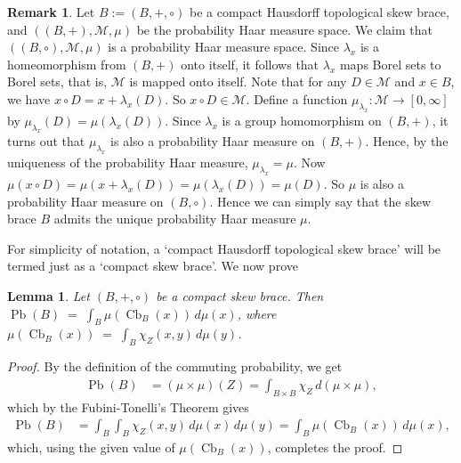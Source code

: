 \documentclass[oneside]{amsart}
\numberwithin{equation}{section}
\theoremstyle{plain}
\newtheorem{lem}[equation]{Lemma}
\theoremstyle{definition}
\newtheorem{remark}[equation]{Remark}
\newcommand{\Cb}{\operatorname{Cb} }
\newcommand{\Pb}{\operatorname{Pb} }
\begin{document}
\begin{remark}\label{rem6.4}
Let $B := (B,+, \circ)$ be a compact Hausdorff topological skew brace, and $((B, +), \mathcal{M}, \mu)$ be the probability Haar measure space.  We claim that $((B, \circ), \mathcal{M}, \mu)$  is a probability Haar measure space.  Since ${\lambda_x}$ is a homeomorphism from  $(B,+)$ onto itself, it follows that 
 ${\lambda_x}$ maps Borel sets to Borel sets, that is, $\mathcal{M}$ is mapped onto itself. Note that for any  $D \in \mathcal{M}$ and $x \in B$, we have    $x \circ D =  x + \lambda_x(D)$. So $x\circ D\in \mathcal{M}$.  Define a function $\mu_{\lambda_x}:\mathcal{M}\rightarrow[0,\infty]$ by $\mu_{\lambda_x}(D)=\mu({\lambda_x}(D))$. Since $\lambda_x$ is a group homomorphism on $(B, +)$, it turns out that $\mu_{\lambda_x}$ is also a probability Haar measure on $(B,+)$. Hence,  by the uniqueness of the probability Haar measure, $\mu_{\lambda_x}=\mu$. Now $\mu( x\circ D)=\mu(x+\lambda_x(D))=\mu(\lambda_x(D))=\mu(D) $. So $\mu $ is also a probability Haar measure on $(B,\circ)$. Hence we can simply say that the skew brace $B$ admits the unique probability Haar measure $\mu$.
\end{remark}

    
For simplicity of notation,  a `compact Hausdorff topological skew brace' will be termed just as a `compact skew brace'. We now prove

\begin{lem} \label{lem: int and cbd}
    Let $(B,+, \circ)$ be a compact  skew brace. Then
$ \Pb(B) \;=\; \int_{B} \mu(\Cb_{B}(x)) \, d\mu(x)$,
where
$\mu(\Cb_{B}(x)) \;=\; \int_{B} \chi_{Z}(x,y)\, d\mu(y)$.
\end{lem}
\begin{proof}
By the definition of the commuting probability, we get 
\begin{align*}
          \Pb(B)&= (\mu \times \mu)(Z) = \int_{B \times B} \chi_{Z} \, d(\mu \times \mu),
\end{align*}
     which  by the Fubini-Tonelli’s Theorem \cite[Section 36]{PRH50} gives 
     \begin{align*}
          \Pb(B) &= \int_{B} \int_{B} \chi_{Z}(x,y) \, d\mu(x) \, d\mu(y) =\int_{B} \mu(\Cb_{B}(x)) \, d\mu(x),
\end{align*}
which, using the given value of  $\mu(\Cb_{B}(x))$,  completes the proof.
\end{proof}
\end{document}
